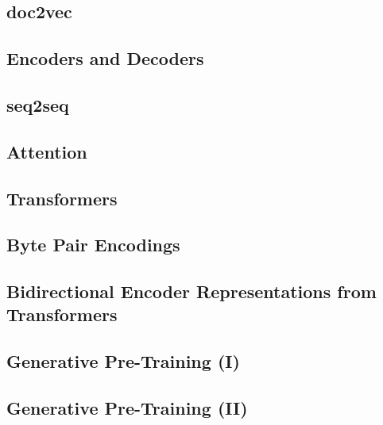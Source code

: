 \subsection{doc2vec}\label{sec:language-models:doc2vec}

\subsection{Encoders and Decoders}\label{sec:language-models:encoders-decoders}
\subsection{seq2seq}\label{sec:language-models:seq2seq}

\subsection{Attention}\label{sec:language-models:attention}


\subsection{Transformers}\label{sec:language-models:transformers}
\subsection{Byte Pair Encodings}\label{sec:language-models:bpe}

\subsection{Bidirectional Encoder Representations from Transformers}\label{sec:language-models:bert}
\subsection{Generative Pre-Training (I)}\label{sec:language-models:gpt}
\subsection{Generative Pre-Training (II)}\label{sec:language-models:gpt-2}
